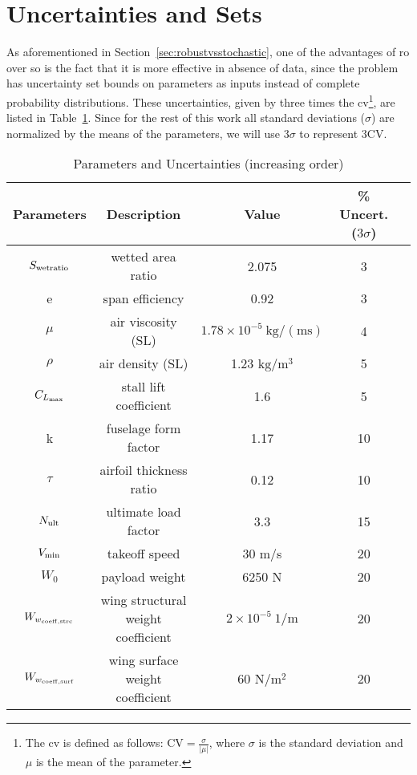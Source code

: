 \section{Uncertainties and Sets}
\label{uncertainties_and_sets}

As aforementioned in Section~\ref{sec:robustvsstochastic}, one of the advantages
of \gls{ro} over \gls{so} is the fact that it is more effective in absence of
data, since the problem has uncertainty set bounds on parameters as inputs instead
of complete probability distributions.
These uncertainties, given by three times the \gls{cv}\footnote{The \gls{cv}
is defined as follows: $\text{CV} = \frac{\sigma}{|\mu|}$, where $\sigma$ is the standard deviation and $\mu$ is the mean of the parameter.},
are listed in Table~\ref{tab:uncertainties}. Since for the rest of this work
all standard deviations ($\sigma$) are normalized by the means of the parameters, we will use $3\sigma$
to represent $3\text{CV}$.

\begin{table}
\begin{center}
\caption{\label{tab:uncertainties} Parameters and Uncertainties (increasing order)}
\begin{tabular}{c c c c c}
\hline
Parameters & Description & Value & \% Uncert. ($3\sigma$) \\
\hline
$S_{\rm{wetratio}}$ & wetted area ratio & 2.075 & 3\\
e & span efficiency & 0.92 & 3\\
$\mu$ & air viscosity (SL) & $1.78 \times 10^{-5}~\mathrm{kg/(ms)}$ & 4 \\
$\rho$ & air density (SL) & 1.23 $\mathrm{kg/m^3}$ & 5 \\
$C_{L_{\rm{max}}}$ & stall lift coefficient & 1.6 & 5\\
k & fuselage form factor & 1.17 & 10\\
$\tau$ & airfoil thickness ratio & 0.12 & 10\\
$N_{\rm{ult}}$ & ultimate load factor & 3.3 & 15\\
$V_{\rm{min}}$ & takeoff speed & 30 m/s & 20\\
$W_0$ & payload weight & 6250 N & 20\\
$W_{w_{\rm{coeff,strc}}}$ & wing structural weight coefficient & $2 \times 10^{-5}~1/\mathrm{m}$ & 20\\
$W_{w_{\rm{coeff,surf}}}$ & wing surface weight coefficient & 60 $\mathrm{N/m^2}$ & 20\\
\hline
\end{tabular}
\end{center}
\end{table}

